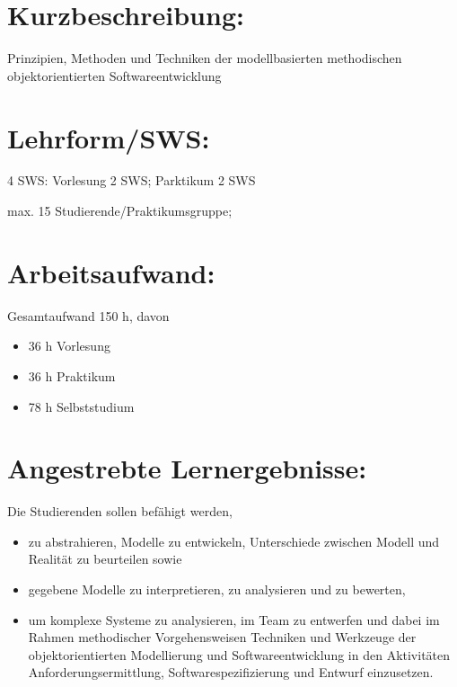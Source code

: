 \section*{Kurzbeschreibung:}\label{kurzbeschreibung-3}

Prinzipien, Methoden und Techniken der modellbasierten methodischen
objektorientierten Softwareentwicklung

\section*{Lehrform/SWS:}\label{lehrformsws-22}

4 SWS: Vorlesung 2 SWS; Parktikum 2 SWS

max. 15 Studierende/Praktikumsgruppe;

\section*{Arbeitsaufwand:}\label{arbeitsaufwand-21}

Gesamtaufwand 150 h, davon

\begin{itemize}
\tightlist
\item
  36 h Vorlesung
\item
  36 h Praktikum
\item
  78 h Selbststudium
\end{itemize}

\section*{Angestrebte
Lernergebnisse:}\label{angestrebte-lernergebnisse-22}

Die Studierenden sollen befähigt werden,

\begin{itemize}
\tightlist
\item
  zu abstrahieren, Modelle zu entwickeln, Unterschiede zwischen Modell
  und Realität zu beurteilen sowie
\item
  gegebene Modelle zu interpretieren, zu analysieren und zu bewerten,
\item
  um komplexe Systeme zu analysieren, im Team zu entwerfen und dabei im
  Rahmen methodischer Vorgehensweisen Techniken und Werkzeuge der
  objektorientierten Modellierung und Softwareentwicklung in den
  Aktivitäten Anforderungsermittlung, Softwarespezifizierung und Entwurf
  einzusetzen.
\end{itemize}

